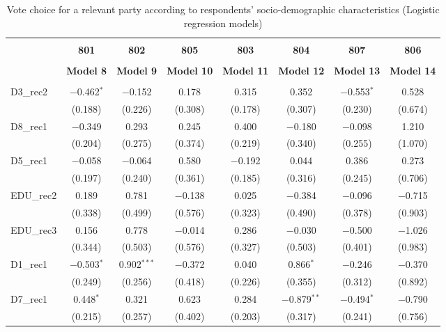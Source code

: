 \documentclass[
]{article}
\begin{document}
\begin{table}[!htbp] \centering 
  \caption{Vote choice for a relevant party according to respondents' 
                       socio-demographic characteristics (Logistic regression models)} 
  \label{table:full_logit_de} 
\begin{tabular}{@{\extracolsep{5pt}}lccccccc} 
\\[-1.8ex]\hline \\[-1.8ex] 
 & \textbf{801} & \textbf{802} & \textbf{805} & \textbf{803} & \textbf{804} & \textbf{807} & \textbf{806} \\ 
\\[-1.8ex] & \textbf{Model 8} & \textbf{Model 9} & \textbf{Model 10} & \textbf{Model 11} & \textbf{Model 12} & \textbf{Model 13} & \textbf{Model 14}\\ 
\hline \\[-1.8ex] 
 D3\_rec2 & $-$0.462$^{*}$ & $-$0.152 & 0.178 & 0.315 & 0.352 & $-$0.553$^{*}$ & 0.528 \\ 
  & (0.188) & (0.226) & (0.308) & (0.178) & (0.307) & (0.230) & (0.674) \\ 
  D8\_rec1 & $-$0.349 & 0.293 & 0.245 & 0.400 & $-$0.180 & $-$0.098 & 1.210 \\ 
  & (0.204) & (0.275) & (0.374) & (0.219) & (0.340) & (0.255) & (1.070) \\ 
  D5\_rec1 & $-$0.058 & $-$0.064 & 0.580 & $-$0.192 & 0.044 & 0.386 & 0.273 \\ 
  & (0.197) & (0.240) & (0.361) & (0.185) & (0.316) & (0.245) & (0.706) \\ 
  EDU\_rec2 & 0.189 & 0.781 & $-$0.138 & 0.025 & $-$0.384 & $-$0.096 & $-$0.715 \\ 
  & (0.338) & (0.499) & (0.576) & (0.323) & (0.490) & (0.378) & (0.903) \\ 
  EDU\_rec3 & 0.156 & 0.778 & $-$0.014 & 0.286 & $-$0.030 & $-$0.500 & $-$1.026 \\ 
  & (0.344) & (0.503) & (0.576) & (0.327) & (0.503) & (0.401) & (0.983) \\ 
  D1\_rec1 & $-$0.503$^{*}$ & 0.902$^{***}$ & $-$0.372 & 0.040 & 0.866$^{*}$ & $-$0.246 & $-$0.370 \\ 
  & (0.249) & (0.256) & (0.418) & (0.226) & (0.355) & (0.312) & (0.892) \\ 
  D7\_rec1 & 0.448$^{*}$ & 0.321 & 0.623 & 0.284 & $-$0.879$^{**}$ & $-$0.494$^{*}$ & $-$0.790 \\ 
  & (0.215) & (0.257) & (0.402) & (0.203) & (0.317) & (0.241) & (0.756) \\ 

\end{tabular}
\end{table}
\end{document}
